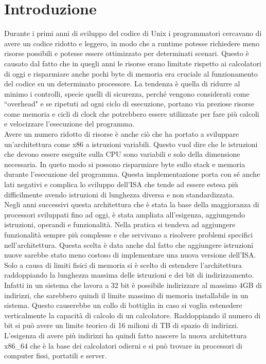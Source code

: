 \chapter*{Introduzione}
Durante i primi anni di sviluppo del codice di Unix i programmatori cercavano di avere un codice ridotto e leggero, in modo che a runtime potesse richiedere meno risorse possibili e potesse essere ottimizzato per determinati scenari. Questo è causato dal fatto che in quegli anni le risorse erano limitate rispetto ai calcolatori di oggi e risparmiare anche pochi byte di memoria era cruciale al funzionamento del codice su un determinato processore. La tendenza è quella di ridurre al minimo i controlli, specie quelli di sicurezza, perché vengono considerati come ``overhead" e se ripetuti ad ogni ciclo di esecuzione, portano via preziose risorse come memoria e cicli di clock che potrebbero essere utilizzate per fare più calcoli e velocizzare l'esecuzione del programma. \\
\newline
Avere un numero ridotto di risorse è anche ciò che ha portato a sviluppare un'architettura come x86 a istruzioni variabili. Questo vuol dire che le istruzioni che devono essere eseguite sulla CPU sono variabili e solo della dimensione necessaria. In queto modo si possono risparmiare byte sullo stack e memoria durante l'esecuzione del programma. Questa implementazione porta con sé anche lati negativi e complica lo sviluppo dell'ISA che tende ad essere estesa più difficilmente avendo istruzioni di lunghezza diversa e non standardizzata. \\
\newline
Negli anni successivi questa architettura che è stata la base della maggioranza di processori sviluppati fino ad oggi, è stata ampliata all'esigenza, aggiungendo istruzioni, operandi e funzionalità. Nella pratica si tendeva ad aggiungere funzionalità sempre più complesse e che servivano a risolvere problemi specifici nell'architettura. Questa scelta è data anche dal fatto che aggiungere istruzioni nuove sarebbe stato meno costoso di implementare una nuova versione dell'ISA. Solo a causa di limiti fisici di memoria si è scelto di estendere l'architettura raddoppiando la lunghezza massima delle istruzioni e dei bit di indirizzamento. Infatti in un sistema che lavora a 32 bit è possibile indirizzare al massimo 4GB di indirizzi, che sarebbero quindi il limite massimo di memoria installabile in un sistema. Questo causerebbe un collo di bottiglia in caso si voglia estenedere verticalmente la capacità di calcolo di un calcolatore. Raddoppiando il numero di bit si può avere un limite teorico di 16 milioni di TB di spazio di indirizzi. L'esigenza di avere più indirizzi ha quindi fatto nascere la nuova architettura x86\_64 che è la base dei calcolatori odierni e si può trovare in processori di computer fissi, portatili e server. \\
